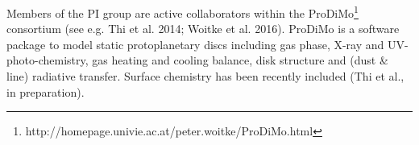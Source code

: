 \documentclass[10pt,fleqn,twoside]{article}
\begin{document}
Members of the PI group are active collaborators within the ProDiMo\footnote{http://homepage.univie.ac.at/peter.woitke/ProDiMo.html} consortium (see e.g. Thi et al. 2014; Woitke et al. 2016).  ProDiMo is a software package to model static protoplanetary discs including gas phase, X-ray and UV-photo-chemistry, gas heating and cooling balance, disk structure and (dust \& line) radiative transfer. Surface chemistry has been recently included (Thi et al., in preparation).

\end{document}
